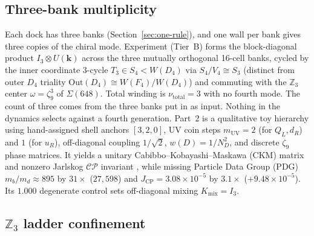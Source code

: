 \subsection{Three-bank multiplicity}

Each dock has three banks (Section~\ref{sec:one-rule}), and one wall per bank gives three copies of the chiral mode.
Experiment  (Tier~B) forms the block-diagonal product $I_3 \otimes U(\mathbf{k})$ across the three
mutually orthogonal 16-cell banks, cycled by the inner coordinate 3-cycle $T_3 \in S_4 < W(D_4)$ via
$S_4 / V_4 \cong S_3$ (distinct from outer $D_4$ triality $\mathrm{Out}(D_4) \cong W(F_4)/W(D_4)$) and commuting with
the $\mathbb{Z}_3$ center $\omega = \zeta_9^3$ of $\Sigma(648)$. Total winding is $\nu_{\mathrm{total}} = 3$ with no
fourth mode. The count of three comes from the three banks put in as input. Nothing in the dynamics selects against a
fourth generation. Part~2 is a qualitative toy hierarchy using hand-assigned
shell anchors $[3, 2, 0]$, UV coin steps $m_{\mathrm{UV}} = 2$ (for $Q_L, d_R$) and $1$ (for $u_R$), off-diagonal coupling
$1/\sqrt{2}$, $w(D) = 1/N_D^2$, and discrete $\zeta_9$ phase matrices. It yields a unitary Cabibbo--Kobayashi--Maskawa
(CKM) matrix and nonzero Jarlskog $\mathcal{CP}$ invariant \cite{jarlskog1985}, while missing Particle Data Group (PDG)
$m_b/m_d \approx 895$ by $31\times$ ($27{,}598$) and $J_{\mathrm{CP}} = 3.08 \times 10^{-5}$ by $3.1\times$
($+9.48 \times 10^{-5}$). Its $1.000$ degenerate control sets off-diagonal mixing $K_{\mathrm{mix}} = I_3$.

\subsection{\texorpdfstring{$\mathbb{Z}_3$}{Z3} ladder confinement}

